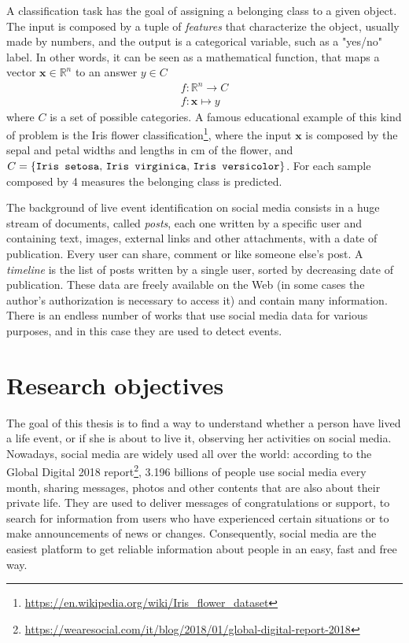 A classification task has the goal of assigning a belonging class to a given object. The input is composed by a tuple of \textit{features} that characterize the object, usually made by numbers, and the output is a categorical variable, such as a "yes/no" label. In other words, it can be seen as a mathematical function, that maps a vector $ \boldsymbol{x} \in \mathbb{R}^n $ to an answer $ y \in C $
\begin{gather*}
f \colon \mathbb{R}^n \to C \\
f \colon \boldsymbol{x} \mapsto y
\end{gather*}
where $C$ is a set of possible categories. A famous educational example of this kind of problem is the Iris flower classification\footnote{\url{https://en.wikipedia.org/wiki/Iris_flower_dataset}}, where the input $ \boldsymbol{x} $ is composed by the sepal and petal widths and lengths in cm of the flower, and $C = \{\text{\texttt{Iris setosa}, \texttt{Iris virginica}, \texttt{Iris versicolor}}\}$. For each sample composed by 4 measures the belonging class is predicted.

The background of live event identification on social media consists in a huge stream of documents, called \textit{posts}, each one written by a specific user and containing text, images, external links and other attachments, with a date of publication. Every user can share, comment or like someone else's post. A \textit{timeline} is the list of posts written by a single user, sorted by decreasing date of publication. These data are freely available on the Web (in some cases the author's authorization is necessary to access it) and contain many information. There is an endless number of works that use social media data for various purposes, and in this case they are used to detect events.

\section{Research objectives}

The goal of this thesis is to find a way to understand whether a person have lived a life event, or if she is about to live it, observing her activities on social media. Nowadays, social media are widely used all over the world: according to the Global Digital 2018 report\footnote{\url{https://wearesocial.com/it/blog/2018/01/global-digital-report-2018}}, 3.196 billions of people use social media every month, sharing messages, photos and other contents that are also about their private life. They are used to deliver messages of congratulations or support, to search for information from users who have experienced certain situations or to make announcements of news or changes. Consequently, social media are the easiest platform to get reliable information about people in an easy, fast and free way.

